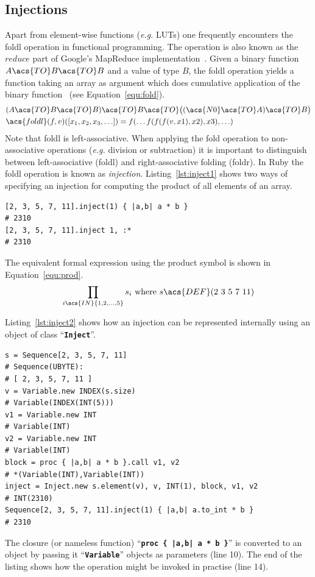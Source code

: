 \documentclass[12pt,a4paper,oneside,openright]{book}
\newcommand{\eg}{\emph{e.g.} }
\newcommand{\equ}[1]{Equation~\ref{equ:#1}}
\newcommand{\lst}[1]{Listing~\ref{lst:#1}}
\newcommand{\code}[1]{``\texttt{\textbf{\textcolor{codegray}{\small{#1}}}}''}
\begin{document}
\begin{CJK}{UTF8}{}
\subsection{Injections}\label{cha:inject}
Apart from element-wise functions (\eg \acp{LUT}) one frequently encounters the \ac{foldl} operation in functional programming. The operation is also known as the $reduce$ part of Google's MapReduce implementation~\citep{laemmel2008google}. Given a binary function $A\acs{TO} B\acs{TO} B$ and a value of type $B$, the \ac{foldl} operation yields a function taking an array as argument which does cumulative application of the binary function~\citep{hutton1999fold} (see \equ{fold}).
\begin{align}\label{equ:fold}
  \begin{split}
    &(A\acs{TO} B\acs{TO} B)\acs{TO} B\acs{TO}\big((\acs{N0}\acs{TO} A)\acs{TO} B\big)\\
    &\acs{foldl}(f,v)([x_1,x_2,x_3,\ldots])=f(\ldots f(f(f(v,x1),x2),x3),\ldots)
  \end{split}
\end{align}
Note that \acs{foldl} is left-associative. When applying the fold operation to non-as\-so\-cia\-ti\-ve operations (\eg division or subtraction) it is important to distinguish between left-as\-so\-cia\-ti\-ve (\acs{foldl}) and right-associative folding (\ac{foldr}).
In Ruby the \ac{foldl} operation is known as \emph{injection}. \lst{inject1} shows two ways of specifying an injection for computing the product of all elements of an array.
\lstset{language=Ruby,frame=single,numbers=none}
\begin{lstlisting}[float=htbp,caption={Left-associative fold operation in Ruby},escapechar=\$,label=lst:inject1]
[2, 3, 5, 7, 11].inject(1) { |a,b| a * b }
# 2310
[2, 3, 5, 7, 11].inject 1, :*
# 2310
\end{lstlisting}
The equivalent formal expression using the product symbol is shown in \equ{prod}.
\begin{equation}\label{equ:prod}
  \prod_{i\acs{IN}\{1,2,\ldots,5\}}s_i\mathrm{\ where\ }s\acs{DEF}(2\ 3\ 5\ 7\ 11)
\end{equation}

\lst{inject2} shows how an injection can be represented internally using an object of class \code{Inject}.
\lstset{language=Ruby,frame=single,numbers=left}
\begin{lstlisting}[float=htbp,caption={Internal representation of injections},escapechar=\$,label=lst:inject2]
s = Sequence[2, 3, 5, 7, 11]
# Sequence(UBYTE):
# [ 2, 3, 5, 7, 11 ]
v = Variable.new INDEX(s.size)
# Variable(INDEX(INT(5)))
v1 = Variable.new INT
# Variable(INT)
v2 = Variable.new INT
# Variable(INT)
block = proc { |a,b| a * b }.call v1, v2
# *(Variable(INT),Variable(INT))
inject = Inject.new s.element(v), v, INT(1), block, v1, v2
# INT(2310)
Sequence[2, 3, 5, 7, 11].inject(1) { |a,b| a.to_int * b }
# 2310
\end{lstlisting}
The closure (or nameless function) \code{proc \{ |a,b| a * b \}} is converted to an object by passing it \code{Variable} objects as parameters (line 10). The end of the listing shows how the operation might be invoked in practise (line 14).


\end{CJK}
\end{document}
